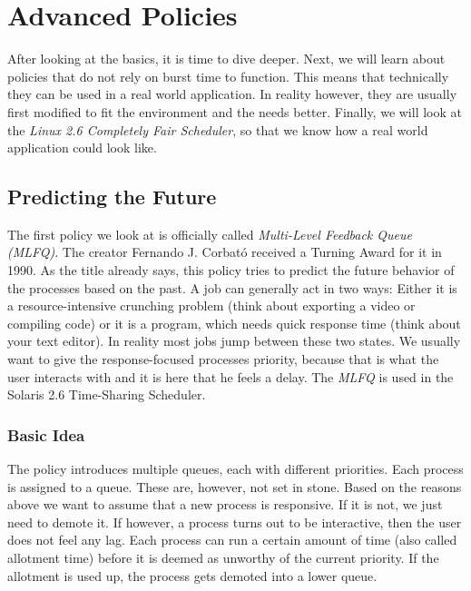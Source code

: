\chapter{Advanced Policies}
After looking at the basics, it is time to dive deeper. Next, we will learn about policies that do not rely on burst time to function. This means that technically they can be used in a real world application. In reality however, they are usually first modified to fit the environment and the needs better.
Finally, we will look at the \emph{Linux 2.6 Completely Fair Scheduler}, so that we know how a real world application could look like.

\section{Predicting the Future}


The first policy we look at is officially called \emph{Multi-Level Feedback Queue (MLFQ)}. The creator Fernando J. Corbató received a Turning Award for it in 1990.
As the title already says, this policy tries to predict the future behavior of the processes based on the past.
A job can generally act in two ways:
Either it is a resource-intensive crunching problem (think about exporting a video or compiling code) or it is a program, which needs quick response time (think about your text editor).
In reality most jobs jump between these two states.
We usually want to give the response-focused processes priority, because that is what the user interacts with and it is here that he feels a delay.
The \emph{MLFQ} is used in the Solaris 2.6 Time-Sharing Scheduler.

\subsection{Basic Idea}

The policy introduces multiple queues, each with different priorities.
Each process is assigned to a queue. These are, however, not set in stone.
Based on the reasons above we want to assume that a new process is responsive.
If it is not, we just need to demote it.
If however, a process turns out to be interactive, then the user does not feel any lag. 
Each process can run a certain amount of time (also called allotment time) before it is deemed as unworthy of the current priority.
If the allotment is used up, the process gets demoted into a lower queue.

